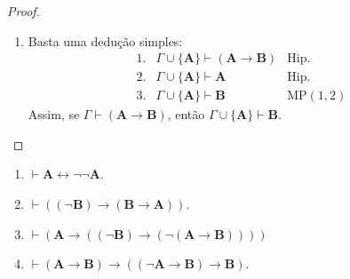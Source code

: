 \begin{proof}
\begin{enumerate}[leftmargin=*, align=left, label=\textbf{(\alph*)}]
\[\begin{array}{rll}
                        & \vdots & \vdots \\
                        j. & \Gamma \vdash (\mathbf{A} \rightarrow (\mathbf{C} \rightarrow \mathbf{B})) & \\[1ex]
                        k. & \Gamma \vdash ((\mathbf{A} \rightarrow (\mathbf{C} \rightarrow \mathbf{B})) \rightarrow ((\mathbf{A} \rightarrow \mathbf{C}) \rightarrow (\mathbf{A} \rightarrow \mathbf{B}))) & \mathrm{Ax}_2 \\[1ex]
                        l. & \Gamma \vdash ((\mathbf{A} \rightarrow \mathbf{C}) \rightarrow (\mathbf{A} \rightarrow \mathbf{B})) & \text{MP}(j, k) \\[1ex]
                        m. & \Gamma \vdash (\mathbf{A} \rightarrow \mathbf{B}) & \text{MP}(i, l)
                    \end{array}
                \]
            Assim, se $\Gamma \cup \{\mathbf{A}\} \vdash \mathbf{B}$, então $\Gamma \vdash (\mathbf{A} \rightarrow \mathbf{B})$. \blackproof
            \item Basta uma dedução simples:
                \[
                    \begin{array}{rll}
                        1. & \Gamma \cup \{\mathbf{A}\} \vdash (\mathbf{A} \rightarrow \mathbf{B}) & \text{Hip.}\\
                        2. & \Gamma \cup \{\mathbf{A}\} \vdash \mathbf{A} & \text{Hip.} \\
                        3. & \Gamma \cup \{\mathbf{A}\} \vdash \mathbf{B} & \text{MP}(1,2)
                    \end{array}
                \]
            Assim, se $\Gamma \vdash (\mathbf{A} \rightarrow \mathbf{B})$, então $\Gamma \cup \{\mathbf{A}\} \vdash \mathbf{B}$. \blackproof
        \end{enumerate}
\end{proof}

\begin{proposition} \label{prop.fund:propriedadesvdash}
    \leavevmode
        \begin{enumerate}[leftmargin=*, align=left, label=\textbf{(\alph*)}]
            \item $\vdash \mathbf{A} \leftrightarrow \neg \neg \mathbf{A}$.
            \item $\vdash ((\neg \mathbf{B}) \rightarrow (\mathbf{B} \rightarrow \mathbf{A}))$.
            \item $\vdash (\mathbf{A} \rightarrow ((\neg \mathbf{B}) \rightarrow (\neg(\mathbf{A} \rightarrow \mathbf{B}))))$
            \item $\vdash (\mathbf{A} \rightarrow \mathbf{B}) \rightarrow ((\neg \mathbf{A} \rightarrow \mathbf{B}) \rightarrow \mathbf{B})$.
        \end{enumerate}
\end{proposition}

